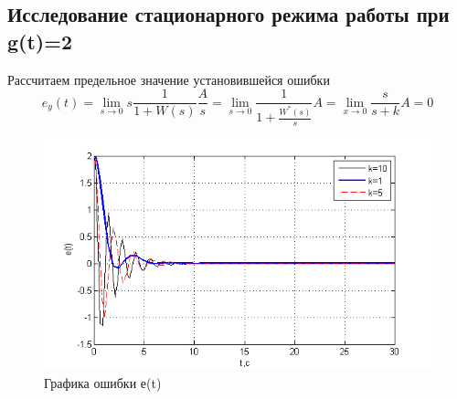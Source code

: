 \documentclass[a4paper, 11pt]{article}
\begin{document}
\subsection{Исследование стационарного режима работы при g(t)=2}
Рассчитаем предельное значение установившейся ошибки
\[{e_y}(t) = \mathop {\lim }\limits_{s \to 0} s\frac{1}{{1 + W(s)}}\frac{A}{s} = \mathop {\lim }\limits_{s \to 0} \frac{1}{{1 + \frac{{{W^*}(s)}}{s}}}A = \mathop {\lim }\limits_{x \to 0} \frac{s}{{s + k}}A = 0\]


\begin{figure}[h]
	\centering
	\includegraphics[width=0.7\linewidth]{7}
	\caption{Графика ошибки е(t)}
	\label{fig:7}
\end{figure}
\end{document}
